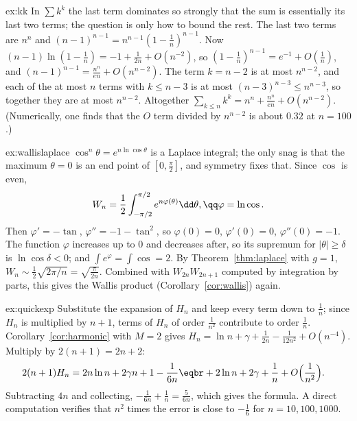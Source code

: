 \begin{solution}{ex:kk}
\idea In $\sum k^k$ the last term dominates so strongly that the sum is essentially its last two terms; the question is only how to bound the rest.
\writeup The last two terms are $n^n$ and $(n-1)^{n-1}=n^{n-1}(1-\frac1n)^{n-1}$. Now $(n-1)\ln(1-\frac1n)=-1+\frac1{2n}+O(n^{-2})$, so $(1-\frac1n)^{n-1}=e^{-1}+O(\frac1n)$, and
$(n-1)^{n-1}=\frac{n^n}{en}+O(n^{n-2})$. The term $k=n-2$ is at most $n^{n-2}$, and each of the at most $n$ terms with $k\le n-3$ is at most $(n-3)^{n-3}\le n^{n-3}$, so together they are at most
$n^{n-2}$. Altogether $\sum_{k\le n}k^k=n^n+\frac{n^n}{en}+O(n^{n-2})$. (Numerically, one finds that the $O$ term divided by $n^{n-2}$ is about $0.32$ at $n=100$.)
\end{solution}

\begin{solution}{ex:wallislaplace}
\idea $\cos^n\theta=e^{n\ln\cos\theta}$ is a Laplace integral; the only snag is that the maximum $\theta=0$ is an end point of $[0,\frac\pi2]$, and symmetry fixes that.
\writeup Since $\cos$ is even,
\[
\begin{gathered}W_n=\frac12\int_{-\pi/2}^{\pi/2}e^{n\varphi(\theta)}\dd\theta,\qq\varphi=\ln\cos.\end{gathered}
\]
Then $\varphi'=-\tan$, $\varphi''=-1-\tan^2$, so
$\varphi(0)=0$, $\varphi'(0)=0$, $\varphi''(0)=-1$. The function $\varphi$ increases up to $0$ and decreases after, so its supremum for $|\theta|\ge\delta$ is
$\ln\cos\delta<0$; and $\int e^\varphi=\int\cos=2$. By Theorem~\ref{thm:laplace} with $g=1$, $W_n\sim\frac12\sqrt{2\pi/n}=\sqrt{\frac\pi{2n}}$. Combined with $W_{2n}W_{2n+1}$ computed by
integration by parts, this gives the Wallis product (Corollary~\ref{cor:wallis}) again.
\end{solution}

\begin{solution}{ex:quickexp}
\idea Substitute the expansion of $H_n$ and keep every term down to $\frac1n$; since $H_n$ is multiplied by $n+1$, terms of $H_n$ of order $\frac1{n^2}$ contribute to order $\frac1n$.
\writeup Corollary~\ref{cor:harmonic} with $M=2$ gives $H_n=\ln n+\gamma+\frac1{2n}-\frac1{12n^2}+O(n^{-4})$. Multiply by $2(n+1)=2n+2$:
\[
\begin{aligned}2(n+1)H_n&=2n\ln n+2\gamma n+1-\frac1{6n}\eqbr+2\ln n+2\gamma+\frac1n+O\Bigl(\frac1{n^2}\Bigr).\end{aligned}
\]
Subtracting $4n$ and collecting, $-\frac1{6n}+\frac1n=\frac5{6n}$, which gives the formula. A direct computation verifies that $n^2$ times the error is close to $-\frac16$ for $n=10,100,1000$.
\end{solution}

